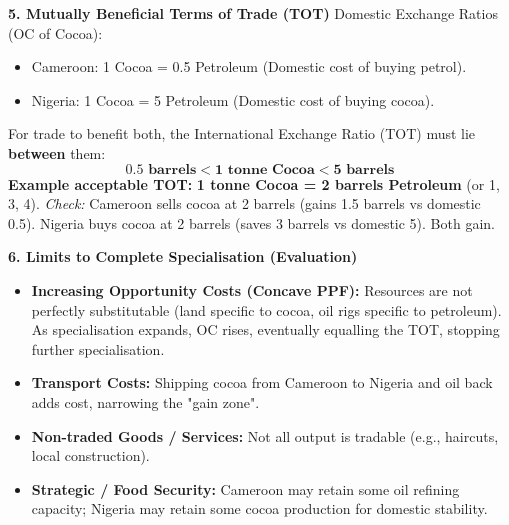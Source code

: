 \documentclass[11pt]{article}
\begin{document}
\begin{exoresolu}
\textbf{5. Mutually Beneficial Terms of Trade (TOT)}
Domestic Exchange Ratios (OC of Cocoa):
\begin{itemize}
    \item Cameroon: 1 Cocoa = 0.5 Petroleum (Domestic cost of buying petrol).
    \item Nigeria: 1 Cocoa = 5 Petroleum (Domestic cost of buying cocoa).
\end{itemize}
For trade to benefit both, the International Exchange Ratio (TOT) must lie \textbf{between} them:
\[ \mathbf{0.5 \text{ barrels} < 1 \text{ tonne Cocoa} < 5 \text{ barrels}} \]
\textbf{Example acceptable TOT:} \textbf{1 tonne Cocoa = 2 barrels Petroleum} (or 1, 3, 4).
\textit{Check:} Cameroon sells cocoa at 2 barrels (gains 1.5 barrels vs domestic 0.5). Nigeria buys cocoa at 2 barrels (saves 3 barrels vs domestic 5). Both gain.

\textbf{6. Limits to Complete Specialisation (Evaluation)}
\begin{itemize}
    \item \textbf{Increasing Opportunity Costs (Concave PPF):} Resources are not perfectly substitutable (land specific to cocoa, oil rigs specific to petroleum). As specialisation expands, OC rises, eventually equalling the TOT, stopping further specialisation.
    \item \textbf{Transport Costs:} Shipping cocoa from Cameroon to Nigeria and oil back adds cost, narrowing the "gain zone".
    \item \textbf{Non-traded Goods / Services:} Not all output is tradable (e.g., haircuts, local construction).
    \item \textbf{Strategic / Food Security:} Cameroon may retain some oil refining capacity; Nigeria may retain some cocoa production for domestic stability.
\end{itemize}
\end{exoresolu}
\end{document}
